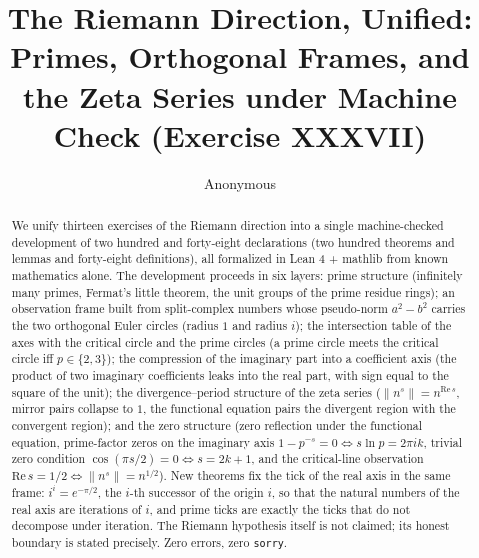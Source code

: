 \documentclass[sigplan,10pt,anonymous,review]{acmart}
\begin{document}
\title{The Riemann Direction, Unified: Primes, Orthogonal Frames, and\\
the Zeta Series under Machine Check (Exercise XXXVII)}

\author{Anonymous}

\begin{abstract}
We unify thirteen exercises of the Riemann direction into a single
machine-checked development of two hundred and forty-eight declarations
(two hundred theorems and lemmas and forty-eight definitions), all
formalized in Lean 4 + mathlib from known mathematics alone. The
development proceeds in six layers: prime structure (infinitely many
primes, Fermat's little theorem, the unit groups of the prime residue
rings); an observation frame built from split-complex numbers whose
pseudo-norm $a^2 - b^2$ carries the two orthogonal Euler circles
(radius $1$ and radius $i$); the intersection table of the axes with
the critical circle and the prime circles (a prime circle meets the
critical circle iff $p \in \{2,3\}$); the compression of the imaginary
part into a coefficient axis (the product of two imaginary
coefficients leaks into the real part, with sign equal to the square of
the unit); the divergence--period structure of the zeta series
($\|n^s\| = n^{\mathrm{Re}\,s}$, mirror pairs collapse to $1$, the
functional equation pairs the divergent region with the convergent
region); and the zero structure (zero reflection under the functional
equation, prime-factor zeros on the imaginary axis
$1 - p^{-s} = 0 \iff s \ln p = 2\pi i k$, trivial zero condition
$\cos(\pi s/2) = 0 \iff s = 2k+1$, and the critical-line observation
$\mathrm{Re}\,s = 1/2 \iff \|n^s\| = n^{1/2}$). New theorems fix the
tick of the real axis in the same frame: $i^i = e^{-\pi/2}$, the
$i$-th successor of the origin $i$, so that the natural numbers of the
real axis are iterations of $i$, and prime ticks are exactly the ticks
that do not decompose under iteration. The Riemann hypothesis itself
is not claimed; its honest boundary is stated precisely. Zero errors,
zero \texttt{sorry}.
\end{abstract}


\maketitle
\end{document}

